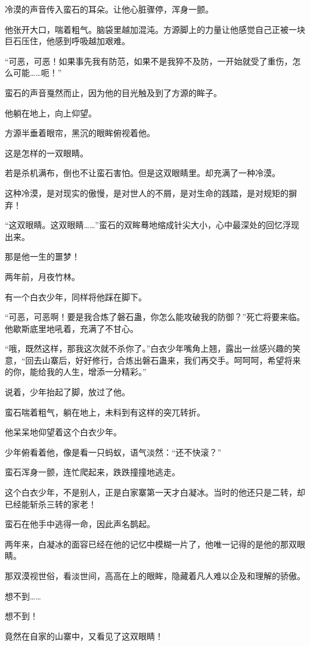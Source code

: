 \begin{this_body}
冷漠的声音传入蛮石的耳朵。让他心脏骤停，浑身一颤。

他张开大口，喘着粗气。脑袋里越加混沌。方源脚上的力量让他感觉自己正被一块巨石压住，他感到呼吸越加艰难。

“可恶，可恶！如果事先我有防范，如果不是我猝不及防，一开始就受了重伤，怎么可能……呃！”

蛮石的声音戛然而止，因为他的目光触及到了方源的眸子。

他躺在地上，向上仰望。

方源半垂着眼帘，黑沉的眼眸俯视着他。

这是怎样的一双眼睛。

若是杀机满布，倒也不让蛮石害怕。但是这双眼睛里。却充满了一种冷漠。

这种冷漠，是对现实的傲慢，是对世人的不屑，是对生命的践踏，是对规矩的摒弃！

“这双眼睛。这双眼睛……”蛮石的双眸蓦地缩成针尖大小，心中最深处的回忆浮现出来。

那是他一生的噩梦！

两年前，月夜竹林。

有一个白衣少年，同样将他踩在脚下。

“可恶，可恶啊！要是我合炼了磐石蛊，你怎么能攻破我的防御？”死亡将要来临。他歇斯底里地吼着，充满了不甘心。

“哦，既然这样，那我这次就不杀你了。”白衣少年嘴角上翘，露出一丝感兴趣的笑意，“回去山寨后，好好修行，合炼出磐石蛊来，我们再交手。呵呵呵，希望将来的你，能给我的人生，增添一分精彩。”

说着，少年抬起了脚，放过了他。

蛮石喘着粗气，躺在地上，未料到有这样的突兀转折。

他呆呆地仰望着这个白衣少年。

少年俯看着他，像是看一只蚂蚁，语气淡然：“还不快滚？”

蛮石浑身一颤，连忙爬起来，跌跌撞撞地逃走。

这个白衣少年，不是别人，正是白家寨第一天才白凝冰。当时的他还只是二转，却已经能斩杀三转的家老！

蛮石在他手中逃得一命，因此声名鹊起。

两年来，白凝冰的面容已经在他的记忆中模糊一片了，他唯一记得的是他的那双眼睛。

那双漠视世俗，看淡世间，高高在上的眼眸，隐藏着凡人难以企及和理解的骄傲。

想不到……

想不到！

竟然在自家的山寨中，又看见了这双眼睛！


\end{this_body}
